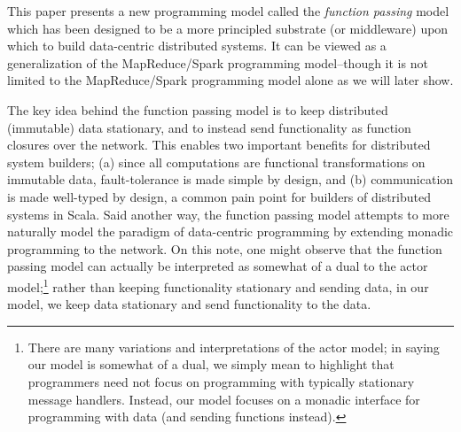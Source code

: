 \documentclass[10pt]{sigplanconf}
\theoremstyle{definition}
\theoremstyle{definition}
\begin{document}
This paper presents a new programming model called the {\em function passing}
model which has been designed to be a more principled substrate (or middleware)
upon which to build data-centric distributed systems. It can be viewed as a
generalization of the MapReduce/Spark programming model--though it is not
limited to the MapReduce/Spark programming model alone as we will later show.

The key idea behind the function passing model is to keep distributed
(immutable) data stationary, and to instead send functionality as function
closures over the network. This enables two important benefits for distributed
system builders; (a) since all computations are functional transformations on
immutable data, fault-tolerance is made simple by design, and (b) communication
is made well-typed by design, a common pain point for builders of distributed
systems in Scala. Said another way, the function passing model attempts to more
naturally model the paradigm of data-centric programming by extending monadic
programming to the network.
On this note, one might observe that the function passing model can actually be
interpreted as somewhat of a dual to the actor model;\footnote{There are many
variations and interpretations of the actor model; in saying our model is
somewhat of a dual, we simply mean to highlight that programmers need not focus
on programming with typically stationary message handlers. Instead, our model
focuses on a monadic interface for programming with data (and sending functions
instead).} rather than keeping functionality stationary and sending data, in our
model, we keep data stationary and send functionality to the data.



\end{document}
